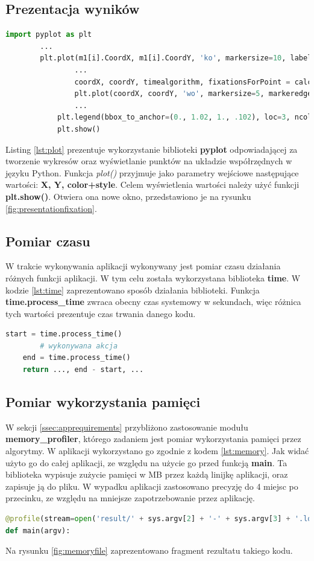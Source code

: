 \subsection{Prezentacja wyników}
\label{ssec:datashow}
\begin{lstlisting}[language=Python, caption=Wyświetlanie wyników, label={lst:plot}]
        import pyplot as plt
        ...
        plt.plot(m1[i].CoordX, m1[i].CoordY, 'ko', markersize=10, label='Eye-tracker points' if i == 0 else "")
                ...
                coordX, coordY, timealgorithm, fixationsForPoint = calculateIdtAlgorithm(m1)
                plt.plot(coordX, coordY, 'wo', markersize=5, markeredgecolor='r', label='Calculated fixations')
                ...
            plt.legend(bbox_to_anchor=(0., 1.02, 1., .102), loc=3, ncol=2, mode="expand", borderaxespad=0.)
            plt.show()
\end{lstlisting}
Listing \ref{lst:plot} prezentuje wykorzystanie biblioteki \textbf{pyplot} odpowiadającej za tworzenie wykresów oraz wyświetlanie punktów na układzie współrzędnych w języku Python. Funkcja \emph{plot()} przyjmuje jako parametry wejściowe następujące wartości: \textbf{X, Y, color+style}. Celem wyświetlenia wartości należy użyć funkcji \textbf{plt.show()}. Otwiera ona nowe okno, przedstawiono je na rysunku \ref{fig:presentationfixation}.
\subsection{Pomiar czasu}
\label{ssec:timemethod}
W trakcie wykonywania aplikacji wykonywany jest pomiar czasu działania różnych funkcji aplikacji. W tym celu została wykorzystana biblioteka \textbf{time}. W kodzie \ref{lst:time} zaprezentowano sposób działania biblioteki. Funkcja \textbf{time.process\_time} zwraca obecny czas systemowy w sekundach, więc różnica tych wartości prezentuje czas trwania danego kodu.
\begin{lstlisting}[language=Python, caption=Pomiar czasu, label={lst:time}]
    start = time.process_time()
        # wykonywana akcja
    end = time.process_time()
    return ..., end - start, ...
\end{lstlisting}
\subsection{Pomiar wykorzystania pamięci}
\label{ssec:memorymethod}
W sekcji \ref{ssec:apprequirements} przybliżono zastosowanie modułu \textbf{memory\_profiler}, którego zadaniem jest pomiar wykorzystania pamięci przez algorytmy. W aplikacji wykorzystano go zgodnie z kodem \ref{lst:memory}. Jak widać użyto go do całej aplikacji, ze względu na użycie go przed funkcją \textbf{main}. Ta biblioteka wypisuje zużycie pamięci w MB przez każdą linijkę aplikacji, oraz zapisuje ją do pliku. W wypadku aplikacji zastosowano precyzję do 4 miejsc po przecinku, ze względu na mniejsze zapotrzebowanie przez aplikację.
\begin{lstlisting}[language=Python, caption=Pomiar wykorzystania pamięci, label={lst:memory}]
@profile(stream=open('result/' + sys.argv[2] + '-' + sys.argv[3] + '.log','w+'), precision=4)
def main(argv):
\end{lstlisting}
Na rysunku \ref{fig:memoryfile} zaprezentowano fragment rezultatu takiego kodu.
